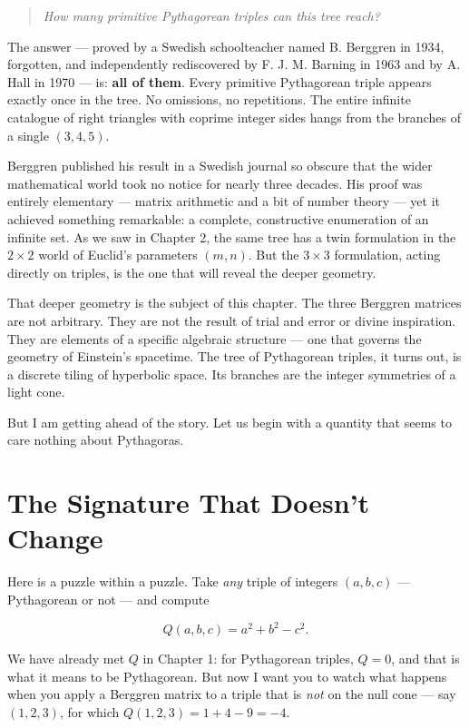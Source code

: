 \documentclass[11pt,twoside,openright]{book}
\theoremstyle{definition}
\theoremstyle{remark}
\begin{document}
\begin{quote}
\textit{How many primitive Pythagorean triples can this tree reach?}
\end{quote}
The answer --- proved by a Swedish schoolteacher named B. Berggren in 1934, forgotten, and independently rediscovered by F. J. M. Barning in 1963 and by A. Hall in 1970 --- is: \textbf{all of them}. Every primitive Pythagorean triple appears exactly once in the tree. No omissions, no repetitions. The entire infinite catalogue of right triangles with coprime integer sides hangs from the branches of a single $(3, 4, 5)$.



Berggren published his result in a Swedish journal so obscure that the wider mathematical world took no notice for nearly three decades. His proof was entirely elementary --- matrix arithmetic and a bit of number theory --- yet it achieved something remarkable: a complete, constructive enumeration of an infinite set. As we saw in Chapter 2, the same tree has a twin formulation in the $2 \times 2$ world of Euclid's parameters $(m, n)$. But the $3 \times 3$ formulation, acting directly on triples, is the one that will reveal the deeper geometry.

That deeper geometry is the subject of this chapter. The three Berggren matrices are not arbitrary. They are not the result of trial and error or divine inspiration. They are elements of a specific algebraic structure --- one that governs the geometry of Einstein's spacetime. The tree of Pythagorean triples, it turns out, is a discrete tiling of hyperbolic space. Its branches are the integer symmetries of a light cone.

But I am getting ahead of the story. Let us begin with a quantity that seems to care nothing about Pythagoras.


\section{The Signature That Doesn't Change}

Here is a puzzle within a puzzle. Take \textit{any} triple of integers $(a, b, c)$ --- Pythagorean or not --- and compute

\[Q(a, b, c) = a^2 + b^2 - c^2.\]

We have already met $Q$ in Chapter 1: for Pythagorean triples, $Q = 0$, and that is what it means to be Pythagorean. But now I want you to watch what happens when you apply a Berggren matrix to a triple that is \textit{not} on the null cone --- say $(1, 2, 3)$, for which $Q(1, 2, 3) = 1 + 4 - 9 = -4$.
\end{document}
